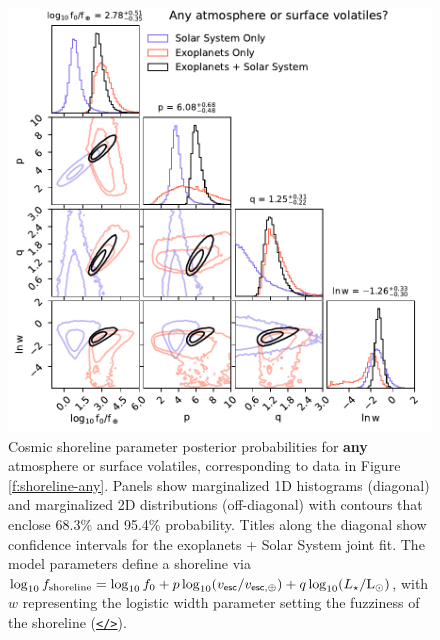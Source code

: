 \documentclass[modern,linenumbers,trackchanges]{aastex7}
\begin{document}
\begin{figure}[ht!]
\includegraphics[width=\textwidth]{figures/posteriors-any.pdf}

\caption{Cosmic shoreline parameter posterior probabilities for {\bf any} atmosphere or surface volatiles, corresponding to data in Figure \ref{f:shoreline-any}. Panels show marginalized 1D histograms (diagonal) and marginalized 2D distributions (off-diagonal) with contours that enclose 68.3\% and 95.4\% probability. Titles along the diagonal show confidence intervals for the exoplanets + Solar System joint fit. The model parameters define a shoreline via $\log_{10} f_{\rm shoreline} = \log_{10} f_{0} + p \log_{10} (v_{\sf esc}/v_{\sf esc, \oplus}) + q \log_{10} (L_\star/\mathrm{L_\odot})$, with $w$ representing the logistic width parameter setting the fuzziness of the shoreline  (\href{https://github.com/zkbt/shoreline/blob/main/notebooks/print-and-visualize-posteriors.ipynb}{\texttt{</>}}).}
\label{f:posteriors-any}
\end{figure}
\end{document}

